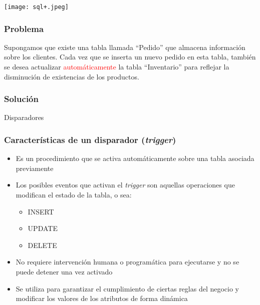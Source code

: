 {
	{%
		\texttt{[image: sql+.jpeg]}
	}
	
	\begin{frame}
	\end{frame}
}


\begin{frame}
	
	\frametitle{Problema}
	
	Supongamos que existe una tabla llamada ``Pedido'' que almacena información sobre los clientes. Cada vez que se inserta un nuevo pedido en esta tabla, también se desea actualizar \textcolor<2>{red}{automáticamente} la tabla ``Inventario'' para reflejar la disminución de existencias de los productos.
	
\end{frame}


\begin{frame}
	
	\frametitle{Solución}
	
    \centering
    \Huge Disparadores
	
\end{frame}


\begin{frame}[t]
	
	\frametitle{Características de un disparador (\emph{trigger})}
	
	\begin{itemize}
		
		\item Es un procedimiento que se activa automáticamente sobre una tabla asociada previamente
		
		\pause
		\item Los posibles eventos que activan el \emph{trigger} son aquellas operaciones que modifican el estado de la tabla, o sea: 
			\begin{itemize}
				\item \textcolor{codepurple}{INSERT}
				\item \textcolor{codepurple}{UPDATE}
				\item \textcolor{codepurple}{DELETE}
			\end{itemize}
			
		\pause
		\item No requiere intervención humana o programática para ejecutarse y no se puede detener una vez activado
		
		\pause
		\item Se utiliza para garantizar el cumplimiento de ciertas reglas del negocio y modificar los valores de los atributos de forma dinámica
		
	\end{itemize}	
	
\end{frame}

